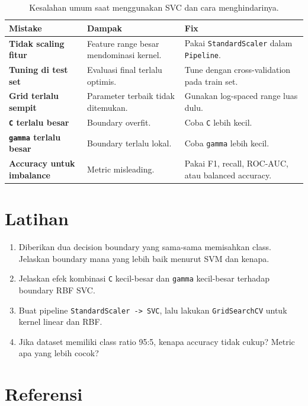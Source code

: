 \documentclass{article}
\newcommand{\code}[1]{\texttt{#1}}
\begin{document}
\begin{table}[H]
\centering
{}
\begin{tabularx}{\textwidth}{>{\bfseries}lXX}
\rowcolor{softOrange}
Mistake & Dampak & Fix \\
\toprule
Tidak scaling fitur & Feature range besar mendominasi kernel. & Pakai \code{StandardScaler} dalam \code{Pipeline}. \\
Tuning di test set & Evaluasi final terlalu optimis. & Tune dengan cross-validation pada train set. \\
Grid terlalu sempit & Parameter terbaik tidak ditemukan. & Gunakan log-spaced range luas dulu. \\
\code{C} terlalu besar & Boundary overfit. & Coba \code{C} lebih kecil. \\
\code{gamma} terlalu besar & Boundary terlalu lokal. & Coba \code{gamma} lebih kecil. \\
Accuracy untuk imbalance & Metric misleading. & Pakai F1, recall, ROC-AUC, atau balanced accuracy. \\
\bottomrule
\end{tabularx}
\caption{Kesalahan umum saat menggunakan SVC dan cara menghindarinya.}
\end{table}

\section{Latihan}

\begin{enumerate}[leftmargin=*]
    \item Diberikan dua decision boundary yang sama-sama memisahkan class. Jelaskan boundary mana yang lebih baik menurut SVM dan kenapa.
    \item Jelaskan efek kombinasi \code{C} kecil-besar dan \code{gamma} kecil-besar terhadap boundary RBF SVC.
    \item Buat pipeline \code{StandardScaler -> SVC}, lalu lakukan \code{GridSearchCV} untuk kernel linear dan RBF.
    \item Jika dataset memiliki class ratio 95:5, kenapa accuracy tidak cukup? Metric apa yang lebih cocok?
\end{enumerate}

\section*{Referensi}
\end{document}
